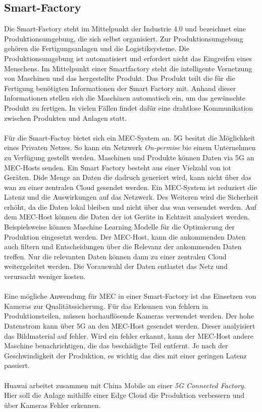 \documentclass[runningheads]{llncs}
\numberwithin{figure}{section}
\begin{document}
\subsection{Smart-Factory}
Die Smart-Factory steht im Mittelpunkt der Industrie 4.0 und bezeichnet eine Produktionsumgebung, die sich selbst organisiert. 
Zur Produktionsumgebung gehören die Fertigungsanlagen und die Logistiksysteme. Die Produktionsumgebung ist automatisiert und erfordert
nicht das Eingreifen eines Menschens. 
Im Mittelpunkt einer Smartfactory steht die intelligente Vernetzung von Maschinen und das hergestellte Produkt. 
Das Produkt teilt die für die Fertigung benötigten Informationen der Smart Factory mit. 
Anhand dieser Informationen stellen sich die Maschinen automatisch ein, um das gewünschte Produkt zu fertigen. 
In vielen Fällen findet dafür eine drahtlose Kommunikation zwischen Produkten und Anlagen statt. 
\\
\\
Für die Smart-Factoy bietet sich ein MEC-System an. 5G besitzt die Möglichkeit eines Privaten Netzes. 
So kann ein Netzwerk \textit{On-permise} bie einem Unternehmen zu Verfügung gestellt werden. 
Maschinen und Produkte können Daten via 5G an MEC-Hosts senden.
Ein Smart Factory besteht aus einer Vielzahl von \acrfull{iot} Geräten. Dide Menge an Daten die dadruch 
generiert wird, kann nicht über das \acrshort{wan} zu einer zentralen Cloud gesendet werden. Ein MEC-System ist reduziert die Latenz
und die Auswirkungen auf das Netzwerk. Des Weiteren wird die Sicherheit erhöht, da die Daten lokal bleiben und nicht über 
das \acrshort{wan} versendet werden. Auf dem MEC-Host können die Daten der \acrshort{iot} Geräte in Echtzeit analysiert werden. Beispielsweise können
Maschine Learning Modelle für die Optimierung der Produktion eingesetzt werden. Der MEC-Host, kann die ankommenden Daten auch filtern und Entscheidungen über
die Relevanz der ankommenden Daten treffen. Nur die relevanten Daten können dann zu einer zentralen Cloud weitergeleitet werden. Die Vorauswahl der Daten entlastet
das Netz und verursacht weniger kosten.
\\
\\
Eine mögliche Anwendung für MEC in einer Smart-Factory ist das Einsetzen von Kameras zur Qualitätssicherung.
Für das Erkennen von fehlern in Produktionsteilen, müssen hochauflösende Kameras verwendet werden. Der hohe Datenstrom
kann über 5G an den MEC-Host gesendet werden. Dieser analyisiert das Bildmaterial auf fehler. Wird ein fehler erkannt,
kann der MEC-Host andere Maschine benachrichtigen, die das beschädigte Teil entfernt. Je nach der Geschwindigkeit der Produktion,
es wichtig das dies mit einer geringen Latenz passiert. 
\\
\\
Huawai arbeitet zusammen mit China Mobile an einer \textit{5G Connected Factory}. Hier soll die Anlage mithilfe 
einer Edge Cloud die Produktion verbessern und über Kameras Fehler erkennen. \cite{WhatNextgenFactory}
\end{document}
